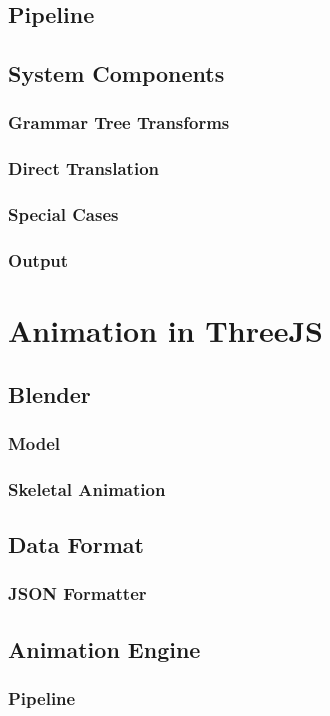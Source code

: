 \documentclass[12pt]{ociamthesis}  %
\begin{document}
	\subsection{Pipeline}
	\subsection{System Components}
		\subsubsection{Grammar Tree Transforms}
		\subsubsection{Direct Translation}
		\subsubsection{Special Cases}
		\subsubsection{Output}
	
\section{Animation in ThreeJS}
	\subsection{Blender}
		\subsubsection{Model}
		\subsubsection{Skeletal Animation}
	\subsection{Data Format}
		\subsubsection{JSON Formatter}
	\subsection{Animation Engine}
		\subsubsection{Pipeline}
\end{document}
